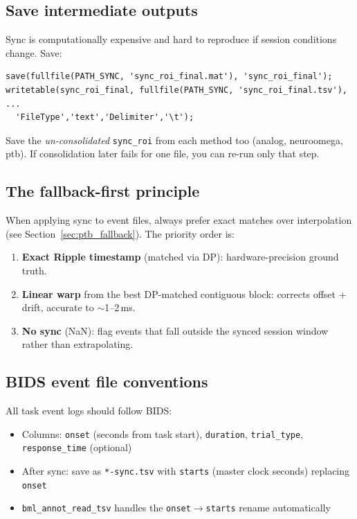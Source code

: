 \documentclass[11pt, a4paper]{article}
\begin{document}
\subsection{Save intermediate outputs}

Sync is computationally expensive and hard to reproduce if session conditions change. Save:

\begin{lstlisting}[style=matlab]
save(fullfile(PATH_SYNC, 'sync_roi_final.mat'), 'sync_roi_final');
writetable(sync_roi_final, fullfile(PATH_SYNC, 'sync_roi_final.tsv'), ...
  'FileType','text','Delimiter','\t');
\end{lstlisting}

Save the \emph{un-consolidated} \texttt{sync\_roi} from each method too (analog, neuroomega, ptb). If consolidation later fails for one file, you can re-run only that step.

\subsection{The fallback-first principle}

When applying sync to event files, always prefer exact matches over interpolation (see Section~\ref{sec:ptb_fallback}). The priority order is:

\begin{enumerate}
  \item \textbf{Exact Ripple timestamp} (matched via DP): hardware-precision ground truth.
  \item \textbf{Linear warp} from the best DP-matched contiguous block: corrects offset + drift, accurate to $\sim$1--2\,ms.
  \item \textbf{No sync} (NaN): flag events that fall outside the synced session window rather than extrapolating.
\end{enumerate}

\subsection{BIDS event file conventions}

All task event logs should follow BIDS:
\begin{itemize}
  \item Columns: \texttt{onset} (seconds from task start), \texttt{duration}, \texttt{trial\_type}, \texttt{response\_time} (optional)
  \item After sync: save as \texttt{*-sync.tsv} with \texttt{starts} (master clock seconds) replacing \texttt{onset}
  \item \texttt{bml\_annot\_read\_tsv} handles the \texttt{onset}$\to$\texttt{starts} rename automatically
\end{itemize}
\end{document}
